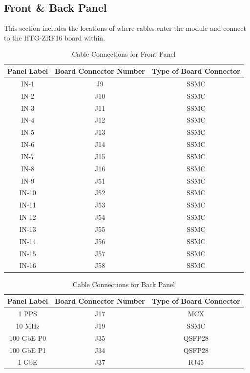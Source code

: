 \documentclass[12pt,a4paper,oneside]{article}
\begin{document}
\subsection{Front \& Back Panel}      
\label{sec:6.1}

This section includes the locations of where cables enter the module and connect to the HTG-ZRF16 board within. 



\begin{table}[H]
\caption{Cable Connections for Front Panel}
\centering
\begin{tabular}{@{}ccc@{}}
\toprule
Panel Label & Board Connector Number & Type of Board Connector\\ 
\midrule
IN-1 & J9 & SSMC\\
IN-2 & J10 & SSMC\\
IN-3 & J11 & SSMC\\
IN-4 & J12 & SSMC\\
IN-5 & J13 & SSMC\\
IN-6 & J14 & SSMC\\
IN-7 & J15 & SSMC\\
IN-8 & J16 & SSMC\\
IN-9 & J51 & SSMC\\
IN-10 & J52 & SSMC\\
IN-11 & J53 & SSMC\\
IN-12 & J54 & SSMC\\
IN-13 & J55 & SSMC\\
IN-14 & J56 & SSMC\\
IN-15 & J57 & SSMC\\
IN-16 & J58 & SSMC\\

\bottomrule            
\end{tabular}
\label{table:front_panel}
\end{table}

\begin{table}[H]
\caption{Cable Connections for Back Panel}
\centering
\begin{tabular}{@{}ccc@{}}
\toprule
 Panel Label & Board Connector Number & Type of Board Connector\\ 
\midrule
1 PPS & J17 & MCX\\
10 MHz & J19 & SSMC\\
100 GbE P0 & J35 & QSFP28\\
100 GbE P1 & J34 & QSFP28\\
1 GbE & J37 & RJ45\\

\bottomrule            
\end{tabular}
\label{table:back_panel}
\end{table}
\end{document}
